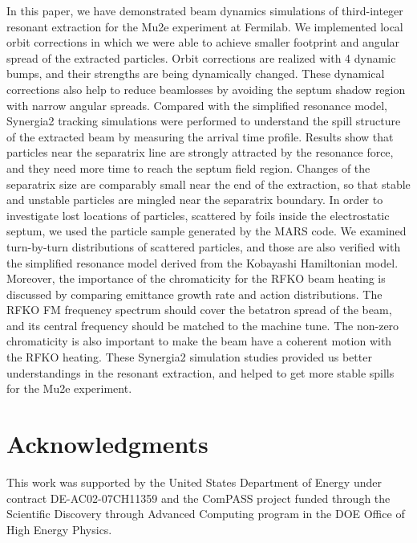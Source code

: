 \documentclass[aps,prstab,onecolumn,preprint]{revtex4-1}
\begin{document}
In this paper, we have demonstrated beam dynamics simulations of third-integer resonant extraction for the Mu2e experiment at Fermilab. We implemented local orbit corrections in which we were able to achieve smaller footprint and angular spread of the extracted particles. Orbit corrections are realized with 4 dynamic bumps, and their strengths are being dynamically changed. These dynamical corrections also help to reduce beamlosses by avoiding the septum shadow region with narrow angular spreads. Compared with the simplified resonance model, Synergia2 tracking simulations were performed to understand the spill structure of the extracted beam by measuring the arrival time profile. Results show that particles near the separatrix line are strongly attracted by the resonance force, and they need more time to reach the septum field region. Changes of the separatrix size are comparably small near the end of the extraction, so that stable and unstable particles are mingled near the separatrix boundary. In order to investigate lost locations of particles, scattered by foils inside the electrostatic septum, we used the particle sample generated by the MARS code. We examined turn-by-turn distributions of scattered particles, and those are also verified with the simplified resonance model derived from the Kobayashi Hamiltonian model. Moreover, the importance of the chromaticity for the RFKO beam heating is discussed by comparing emittance growth rate and action distributions. The RFKO FM frequency spectrum should cover the betatron spread of the beam, and its central frequency should be matched to the machine tune. The non-zero chromaticity is also important to make the beam have a coherent motion with the RFKO heating. These Synergia2 simulation studies provided us better understandings in the resonant extraction, and helped to get more stable spills for the Mu2e experiment.



\section{\label{thanks}Acknowledgments}

This work was supported by the United States Department of Energy under contract DE-AC02-07CH11359 and the ComPASS project funded through the Scientific Discovery through Advanced Computing program in the DOE Office of High Energy Physics.
\end{document}
